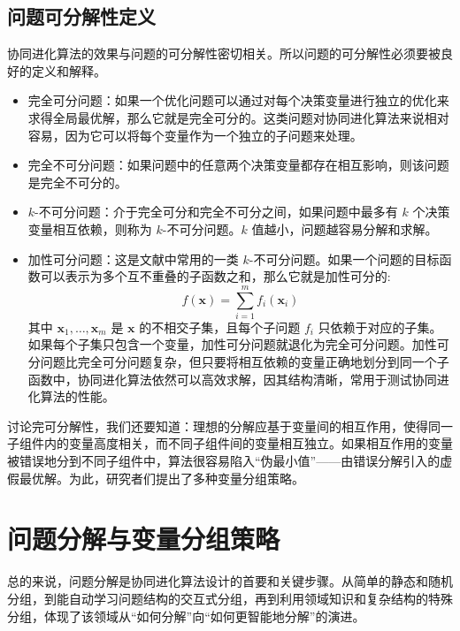\subsection{问题可分解性定义}
协同进化算法的效果与问题的可分解性密切相关。所以问题的可分解性必须要被良好的定义和解释。

\begin{itemize}
\item 完全可分问题：如果一个优化问题可以通过对每个决策变量进行独立的优化来求得全局最优解，那么它就是完全可分的。这类问题对协同进化算法来说相对容易，因为它可以将每个变量作为一个独立的子问题来处理。
\item 完全不可分问题：如果问题中的任意两个决策变量都存在相互影响，则该问题是完全不可分的。
\item $k$-不可分问题：介于完全可分和完全不可分之间，如果问题中最多有 $k$ 个决策变量相互依赖，则称为 $k$-不可分问题。$k$ 值越小，问题越容易分解和求解。
\item 加性可分问题：这是文献中常用的一类 $k$-不可分问题。如果一个问题的目标函数可以表示为多个互不重叠的子函数之和，那么它就是加性可分的:
\[
f(\mathbf{x}) = \sum_{i=1}^{m} f_i(\mathbf{x}_i)
\]
其中 \(\mathbf{x}_1, \ldots, \mathbf{x}_m\) 是 \(\mathbf{x}\) 的不相交子集，且每个子问题 \(f_i\) 只依赖于对应的子集。如果每个子集只包含一个变量，加性可分问题就退化为完全可分问题。加性可分问题比完全可分问题复杂，但只要将相互依赖的变量正确地划分到同一个子函数中，协同进化算法依然可以高效求解，因其结构清晰，常用于测试协同进化算法的性能。
\end{itemize}

讨论完可分解性，我们还要知道：理想的分解应基于变量间的相互作用，使得同一子组件内的变量高度相关，而不同子组件间的变量相互独立。如果相互作用的变量被错误地分到不同子组件中，算法很容易陷入“伪最小值”——由错误分解引入的虚假最优解。为此，研究者们提出了多种变量分组策略。


\section{问题分解与变量分组策略}

总的来说，问题分解是协同进化算法设计的首要和关键步骤。从简单的静态和随机分组，到能自动学习问题结构的交互式分组，再到利用领域知识和复杂结构的特殊分组，体现了该领域从“如何分解”向“如何更智能地分解”的演进。

